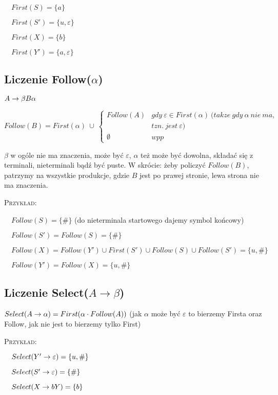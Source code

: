 $\quad First(S) = \{ a \}$

$\quad First(S') = \{ u, \varepsilon \}$

$\quad First(X) = \{ b \}$

$\quad First(Y') = \{ a, \varepsilon \}$

\subsection{Liczenie Follow($\alpha$)}

$A \rightarrow \beta B\alpha$

$Follow(B) = First(\alpha)\ \cup\ \left\{ \begin{array}{ll}  Follow(A) & gdy\ \varepsilon \in First(\alpha)\ (takze\ gdy\ \alpha\ nie\ ma,\\ & tzn.\ jest\ \varepsilon) \\ \emptyset  & wpp  \end{array} \right.$

$\beta$ w ogóle nie ma znaczenia, może być $\varepsilon$, $\alpha$ też może być dowolna, składać się z terminali, nieterminali bądź być puste. W skrócie: żeby policzyć $Follow(B)$, patrzymy na wszystkie produkcje, gdzie $B$ jest po prawej stronie, lewa strona %
nie ma znaczenia.

\textsc{Przykład}:

$\quad Follow(S) = \{ \# \}$ (do nieterminala startowego dajemy symbol końcowy)

$\quad Follow(S') = Follow(S) = \{ \# \}$

$\quad Follow(X) = Follow(Y') \cup First(S') \cup Follow(S) \cup Follow(S') = \{ u, \#\}$

$\quad Follow(Y') = Follow(X) = \{ u, \#\}$

\subsection{Liczenie Select($A \rightarrow \beta$)}

$Select(A \rightarrow \alpha) = First(\alpha \cdot Follow(A))$ (jak $\alpha$ może być $\varepsilon$ to bierzemy Firsta oraz Follow, jak nie jest to bierzemy tylko First)

\textsc{Przykład}:

$\quad Select(Y' \rightarrow \varepsilon) = \{ u, \#\}$

$\quad Select(S' \rightarrow \varepsilon) = \{ \#\}$

$\quad Select(X \rightarrow bY) = \{ b \}$


